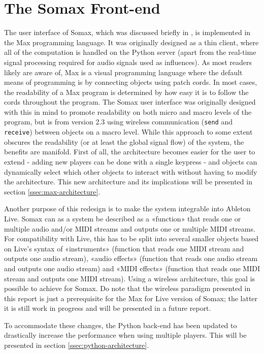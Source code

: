\chapter{The Somax Front-end}\label{sec:wireless}
The user interface of Somax, which was discussed briefly in \cite{borg_2019}, is implemented in the Max programming language. It was originally designed as a thin client, where all of the computation is handled on the Python server (apart from the real-time signal processing required for audio signals used as influences). As most readers likely are aware of, Max is a visual programming language where the default means of programming is by connecting objects using patch cords. In most cases, the readability of a Max program is determined by how easy it is to follow the cords throughout the program. The Somax user interface was originally designed with this in mind to promote readability on both micro and macro levels of the program, but is from version 2.3 using wireless communication (\texttt{send} and \texttt{receive}) between objects on a macro level. While this approach to some extent obscures the readability (or at least the global signal flow) of the system, the benefits are manifold. First of all, the architecture becomes easier for the user to extend - adding new players can be done with a single keypress - and objects can dynamically select which other objects to interact with without having to modify the architecture. This new architecture and its implications will be presented in section \ref{ssec:max-architecture}.

Another purpose of this redesign is to make the system integrable into Ableton Live. Somax can as a system be described as a «function» that reads one or multiple audio and/or MIDI streams and outputs one or multiple MIDI streams. For compatibility with Live, this has to be split into several smaller objects based on Live's syntax of «instruments» (function that reads one MIDI stream and outputs one audio stream), «audio effects» (function that reads one audio stream and outputs one audio stream) and «MIDI effects» (function that reads one MIDI stream and outputs one MIDI stream). Using a wireless architecture, this goal is possible to achieve for Somax. Do note that the wireless paradigm presented in this report is just a prerequisite for the Max for Live version of Somax; the latter it is still work in progress and will be presented in a future report.

To accommodate these changes, the Python back-end has been updated to drastically increase the performance when using multiple players. This will be presented in section \ref{ssec:python-architecture}.

